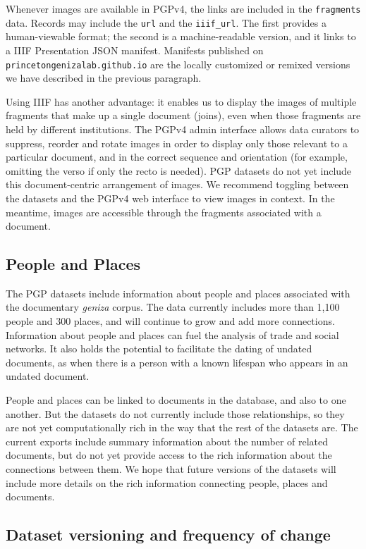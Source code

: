 \documentclass{article}
\begin{document}
Whenever images are available in PGPv4, the links are included in the \texttt{fragments} data. Records may include the \texttt{url} and the \texttt{iiif\_url}. The first provides a human-viewable format; the second is a machine-readable version, and it links to a IIIF Presentation JSON manifest. Manifests published on \texttt{princetongenizalab.github.io} are the locally customized or remixed versions we have described in the previous paragraph.

Using IIIF has another advantage: it enables us to display the images of multiple fragments that make up a single document (joins), even when those fragments are held by different institutions. The PGPv4 admin interface allows data curators to suppress, reorder and rotate images in order to display only those relevant to a particular document, and in the correct sequence and orientation (for example, omitting the verso if only the recto is needed). PGP datasets do not yet include this document-centric arrangement of images. We recommend toggling between the datasets and the PGPv4 web interface to view images in context. In the meantime, images are accessible through the fragments associated with a document.

\subsection{People and Places}

The PGP datasets include information about people and places associated with the documentary \textit{geniza }corpus. The data currently includes more than 1,100 people and 300 places, and will continue to grow and add more connections. Information about people and places can fuel the analysis of trade and social networks. It also holds the potential to facilitate the dating of undated documents, as when there is a person with a known lifespan who appears in an undated document. 

People and places can be linked to documents in the database, and also to one another. But the datasets do not currently include those relationships, so they are not yet computationally rich in the way that the rest of the datasets are. The current exports include summary information about the number of related documents, but do not yet provide access to the rich information about the connections between them. We hope that future versions of the datasets will include more details on the rich information connecting people, places and documents.

\subsection{Dataset versioning and frequency of change}
\end{document}
